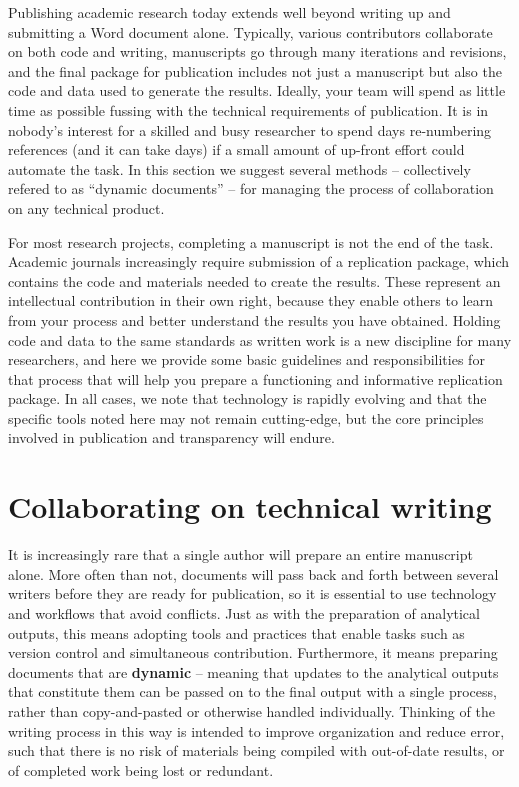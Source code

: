 
\begin{fullwidth}
Publishing academic research today extends well beyond writing up and submitting a Word document alone.
Typically, various contributors collaborate on both code and writing,
manuscripts go through many iterations and revisions,
and the final package for publication includes not just a manuscript
but also the code and data used to generate the results.
Ideally, your team will spend as little time as possible
fussing with the technical requirements of publication.
It is in nobody's interest for a skilled and busy researcher
to spend days re-numbering references (and it can take days)
if a small amount of up-front effort could automate the task.
In this section we suggest several methods --
collectively refered to as ``dynamic documents'' --
for managing the process of collaboration on any technical product.

For most research projects, completing a manuscript is not the end of the task.
Academic journals increasingly require submission of a replication package,
which contains the code and materials needed to create the results.
These represent an intellectual contribution in their own right,
because they enable others to learn from your process
and better understand the results you have obtained.
Holding code and data to the same standards as written work
is a new discipline for many researchers,
and here we provide some basic guidelines and responsibilities for that process
that will help you prepare a functioning and informative replication package.
In all cases, we note that technology is rapidly evolving
and that the specific tools noted here may not remain cutting-edge,
but the core principles involved in publication and transparency will endure.
\end{fullwidth}


\section{Collaborating on technical writing}

It is increasingly rare that a single author will prepare an entire manuscript alone.
More often than not, documents will pass back and forth between several writers
before they are ready for publication,
so it is essential to use technology and workflows that avoid conflicts.
Just as with the preparation of analytical outputs,
this means adopting tools and practices that enable tasks
such as version control and simultaneous contribution.
Furthermore, it means preparing documents that are \textbf{dynamic} --
meaning that updates to the analytical outputs that constitute them
can be passed on to the final output with a single process,
rather than copy-and-pasted or otherwise handled individually.
Thinking of the writing process in this way
is intended to improve organization and reduce error,
such that there is no risk of materials being compiled
with out-of-date results, or of completed work being lost or redundant.


